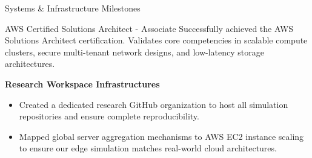 \documentclass[10pt, aspectratio=169]{beamer}
\begin{document}
\begin{frame}{Systems \& Infrastructure Milestones}
    \begin{block}{AWS Certified Solutions Architect - Associate}
        Successfully achieved the AWS Solutions Architect certification. Validates core competencies in scalable compute clusters, secure multi-tenant network designs, and low-latency storage architectures.
    \end{block}

    \vspace{0.3cm}
    \textbf{Research Workspace Infrastructures}
    \begin{itemize}
        \item Created a dedicated research GitHub organization to host all simulation repositories and ensure complete reproducibility.
        \item Mapped global server aggregation mechanisms to AWS EC2 instance scaling to ensure our edge simulation matches real-world cloud architectures.
    \end{itemize}
\end{frame}
\end{document}
